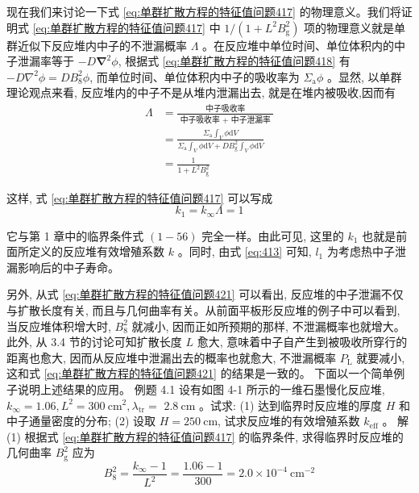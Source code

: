 \documentclass{Sichuan Normal University}
\begin{document}
现在我们来讨论一下式 \eqref{eq:单群扩散方程的特征值问题417} 的物理意义。我们将证明式 \eqref{eq:单群扩散方程的特征值问题417} 中 $1 /\left(1+L^2 B_{\mathrm{g}}^2\right)$ 项的物理意义就是单群近似下反应堆内中子的不泄漏概率 $\Lambda$ 。在反应堆中单位时间、单位体积内的中子泄漏率等于 $-D \boldsymbol{\nabla}^2 \phi$, 根据式 \eqref{eq:单群扩散方程的特征值问题418} 有 $-D \nabla^2 \phi=D B_8^2 \phi$, 而单位时间、单位体积内中子的吸收率为 $\Sigma_{\mathrm{a}} \phi$ 。显然, 以单群理论观点来看, 反应堆内的中子不是从堆内泄漏出去, 就是在堆内被吸收,因而有
\begin{equation}
\begin{aligned}
\Lambda & =\frac{\text { 中子吸收率 }}{\text { 中子吸收率 }+ \text { 中子泄漏率 }} \\
& =\frac{\Sigma_{\mathrm{a}} \int_V \phi \mathrm{d} V}{\Sigma_{\mathrm{a}} \int_V \phi \mathrm{d} V+D B_{\mathrm{g}}^2 \int_V \phi \mathrm{d} V} \\
& =\frac{1}{1+L^2 B_{\mathrm{g}}^2}
\end{aligned}
\label{eq:单群扩散方程的特征值问题421}
\end{equation}

这样, 式 \eqref{eq:单群扩散方程的特征值问题417} 可以写成
\begin{equation}
k_1=k_{\infty} \Lambda=1
\end{equation}

它与第 1 章中的临界条件式 $(1-56)$ 完全一样。由此可见, 这里的 $k_1$ 也就是前面所定义的反应堆有效增殖系数 $k$ 。同时, 由式 \eqref{eq:413} 可知, $l_1$ 为考虑热中子泄漏影响后的中子寿命。

另外, 从式 \eqref{eq:单群扩散方程的特征值问题421} 可以看出, 反应堆的中子泄漏不仅与扩散长度有关, 而且与几何曲率有关。从前面平板形反应堆的例子中可以看到, 当反应堆体积增大时, $B_8^2$ 就减小, 因而正如所预期的那样, 不泄漏概率也就增大。此外, 从 3.4 节的讨论可知扩散长度 $L$ 愈大, 意味着中子自产生到被吸收所穿行的距离也愈大, 因而从反应堆中泄漏出去的概率也就愈大, 不泄漏概率 $P_{\mathrm{L}}$ 就要减小, 这和式 \eqref{eq:单群扩散方程的特征值问题421} 的结果是一致的。
下面以一个简单例子说明上述结果的应用。
例题 4.1 设有如图 4-1 所示的一维石墨慢化反应堆, $k_{\infty}=1.06, L^2=300 \mathrm{~cm}^2, \lambda_{\mathrm{tr}}=$ $2.8 \mathrm{~cm}$ 。试求:
(1) 达到临界时反应堆的厚度 $H$ 和中子通量密度的分布;
(2) 设取 $H=250 \mathrm{~cm}$, 试求反应堆的有效增殖系数 $k_{\mathrm{eff}}$ 。
解 (1) 根据式 \eqref{eq:单群扩散方程的特征值问题417} 的临界条件, 求得临界时反应堆的几何曲率 $B_{\mathrm{g}}^2$ 应为
\begin{equation}
B_8^2=\frac{k_{\infty}-1}{L^2}=\frac{1.06-1}{300}=2.0 \times 10^{-4} \mathrm{~cm}^{-2}
\end{equation}
\end{document}
